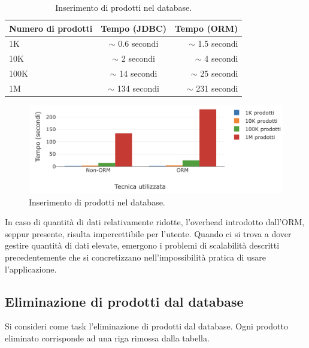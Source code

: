 \begin{table}[h!]
  \begin{center}
    \caption{Inserimento di prodotti nel database.}
    \begin{tabular}{l|c|r} %
      \textbf{Numero di prodotti} & \textbf{Tempo (JDBC)} & \textbf{Tempo (ORM)}\\
      \hline
      1K & $\sim$ 0.6 secondi & $\sim$ 1.5 secondi\\
      10K & $\sim$ 2 secondi & $\sim$ 4 secondi\\
      100K & $\sim$ 14 secondi & $\sim$ 25 secondi\\
      1M & $\sim$ 134 secondi & $\sim$ 231 secondi\\
    \end{tabular}
  \end{center}
\end{table}

\begin{figure}[H]
  \includegraphics[width=\linewidth]{images/insert-products.png}
  \caption{Inserimento di prodotti nel database.}
  \label{fig:insertproducts}
\end{figure}

In caso di quantità di dati relativamente ridotte, l'overhead introdotto dall'ORM, seppur presente, risulta impercettibile per l'utente. Quando ci si trova a dover gestire quantità di dati elevate, emergono i problemi di scalabilità descritti precedentemente che si concretizzano nell'impossibilità pratica di usare l'applicazione.

\newpage

\subsection{Eliminazione di prodotti dal database}

Si consideri come task l'eliminazione di prodotti dal database. Ogni prodotto eliminato corrisponde ad una riga rimossa dalla tabella.


